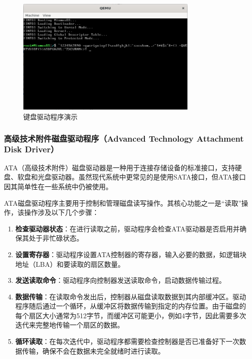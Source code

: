 \begin{figure}[htbp]
    \centering
    \includegraphics[width=0.8\textwidth]{figures/KeyboardDriverPresentation.png}
    \caption{键盘驱动程序演示}
    \label{fig:KeyboardDriverPresentation}
\end{figure}

\subsubsection{高级技术附件磁盘驱动程序（Advanced Technology Attachment Disk Driver）}

ATA（高级技术附件）磁盘驱动器是一种用于连接存储设备的标准接口，支持硬盘、软盘和光盘驱动器。虽然现代系统中更常见的是使用SATA接口，但ATA接口因其简单性在一些系统中仍被使用。

ATA磁盘驱动程序主要用于控制和管理磁盘读写操作。其核心功能之一是“读取”操作，该操作涉及以下几个步骤：

\begin{enumerate}
    \item \textbf{检查驱动器状态}：在进行读取之前，驱动程序会检查ATA驱动器是否启用并确保其处于非忙碌状态。
    \item \textbf{设置寄存器}：驱动程序设置ATA控制器的寄存器，输入必要的数据，如逻辑块地址（LBA）和要读取的扇区数量。
    \item \textbf{发送读取命令}：驱动程序向控制器发送读取命令，启动数据传输过程。
    \item \textbf{数据传输}：在读取命令发出后，控制器从磁盘读取数据到其内部缓冲区。驱动程序随后通过一个循环，从缓冲区将数据传输到指定的内存位置。由于磁盘的每个扇区大小通常为512字节，而缓冲区可能更小，例如4字节，因此需要多次迭代来完整地传输一个扇区的数据。
    \item \textbf{循环读取}：在每次迭代中，驱动程序都需要检查控制器是否已准备好下一次数据传输，确保不会在数据未完全就绪时进行读取。
\end{enumerate}

